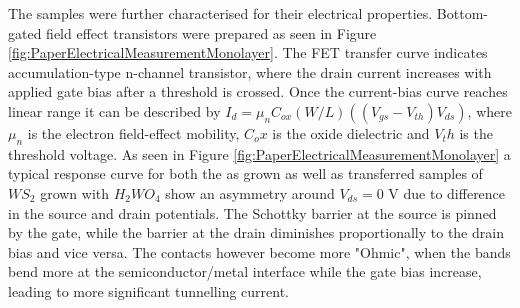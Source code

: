 The samples were further characterised for their electrical properties. Bottom-gated field effect transistors were prepared as seen in Figure \ref{fig:PaperElectricalMeasurementMonolayer}. The FET transfer curve indicates accumulation-type n-channel transistor, where the drain current increases with applied gate bias after a threshold is crossed. Once the current-bias curve reaches linear range it can be described by $I_d = {\mu}_nC_{ox}(W/L) ((V_{gs}-V_{th})V_{ds})$, where ${\mu}_n$ is the electron field-effect mobility, $C_ox$ is the oxide dielectric and $V_th$ is the threshold voltage. As seen in Figure \ref{fig:PaperElectricalMeasurementMonolayer} a typical response curve for both the as grown as well as transferred samples of $WS_2$ grown with $H_2WO_4$ show an asymmetry around $V_{ds}=0$ V due to difference in the source and drain potentials. The Schottky barrier at the source is pinned by the gate, while the barrier at the drain diminishes proportionally to the drain bias and vice versa. The contacts however become more "Ohmic", when the bands bend more at the semiconductor/metal interface while the gate bias increase, leading to more significant tunnelling current.

